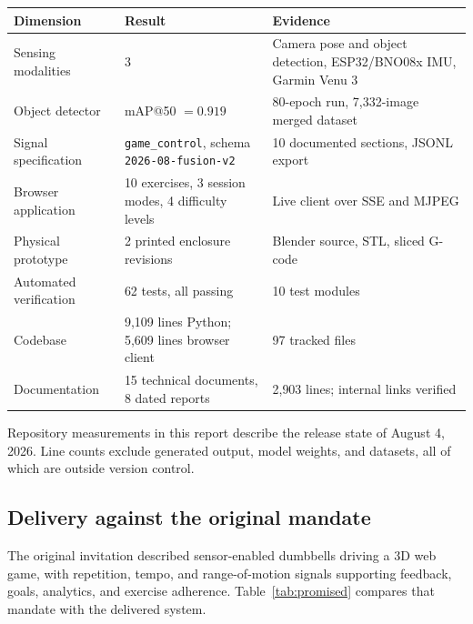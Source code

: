 \documentclass[11pt,a4paper]{article}
\newcommand{\code}[1]{\texttt{\small #1}}
\begin{document}
\begin{table}[H]
\centering
\small
\begin{tabularx}{\textwidth}{@{}L{5.2cm} L{3.2cm} Y@{}}
\toprule
\textbf{Dimension} & \textbf{Result} & \textbf{Evidence} \\
\midrule
Sensing modalities & 3 & Camera pose and object detection, ESP32/BNO08x IMU, Garmin Venu 3 \\
Object detector & mAP@50 $=0.919$ & 80-epoch run, 7{,}332-image merged dataset \\
Signal specification & \code{game\_control}, schema \code{2026-08-fusion-v2} & 10 documented sections, JSONL export \\
Browser application & 10 exercises, 3 session modes, 4 difficulty levels & Live client over SSE and MJPEG \\
Physical prototype & 2 printed enclosure revisions & Blender source, STL, sliced G-code \\
Automated verification & 62 tests, all passing & 10 test modules \\
Codebase & 9{,}109 lines Python; 5{,}609 lines browser client & 97 tracked files \\
Documentation & 15 technical documents, 8 dated reports & 2{,}903 lines; internal links verified \\
\bottomrule
\end{tabularx}
\end{table}

Repository measurements in this report describe the release state of
August 4, 2026. Line counts exclude generated output, model weights, and
datasets, all of which are outside version control.

\subsection*{Delivery against the original mandate}

The original invitation described sensor-enabled dumbbells driving a 3D web game,
with repetition, tempo, and range-of-motion signals supporting feedback, goals,
analytics, and exercise adherence. Table~\ref{tab:promised} compares that mandate
with the delivered system.
\end{document}
